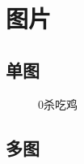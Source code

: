 \documentclass[12pt, a4paper, oneside]{ctexart}
\begin{document}
\begin{table}[htbp]
    \centering  %
    \caption{ }  %
    \label{tab333}  %
    \begin{tabular}{|c|c|}
    \end{tabular}
\end{table}

\begin{table}[htbp]
    \centering  %
    \caption{ }  %
    \label{tab222}  %
    \begin{tabular}{|c|c|}
    \end{tabular}
\end{table}

\newpage

\section{图片}
\subsection{单图}
\begin{figure} [htbp!]

    \caption{0杀吃鸡}
    \label{fig1}
\end{figure}
\subsection{多图}
\newpage
\end{document}
